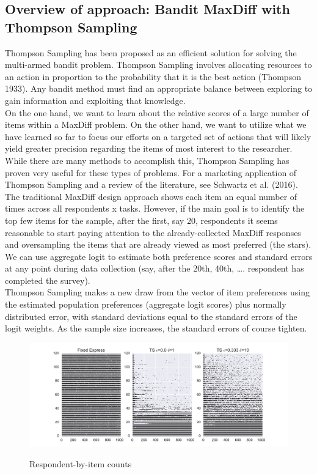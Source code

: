 \documentclass[mksc,blindrev]{informs3} %
\begin{document}
\subsection{Overview of approach: Bandit MaxDiff with Thompson Sampling}
Thompson Sampling has been proposed as an efficient solution for solving the multi-armed bandit problem.  Thompson Sampling involves allocating resources to an action in proportion to the probability that it is the best action (Thompson 1933).  Any bandit method must find an appropriate balance between exploring to gain information and exploiting that knowledge.\\
On the one hand, we want to learn about the relative scores of a large number of items within a MaxDiff problem. On the other hand, we want to utilize what we have learned so far to focus our efforts on a targeted set of actions that will likely yield greater precision regarding the items of most interest to the researcher. While there are many methods to accomplish this, Thompson Sampling has proven very useful for these types of problems. For a marketing application of Thompson Sampling and a review of the literature, see Schwartz et al. (2016). \\
The traditional MaxDiff design approach shows each item an equal number of times across all respondents x tasks.  However, if the main goal is to identify the top few items for the sample, after the first, say 20, respondents it seems reasonable to start paying attention to the already-collected MaxDiff responses and oversampling the items that are already viewed as most preferred (the stars).  We can use aggregate logit to estimate both preference scores and standard errors at any point during data collection (say, after the 20th, 40th, …. respondent has completed the survey).\\
Thompson Sampling makes a new draw from the vector of item preferences using the estimated population preferences (aggregate logit scores) plus normally distributed error, with standard deviations equal to the standard errors of the logit weights.  As the sample size increases, the standard errors of course tighten.\\
\begin{figure}[!ht]
\caption{Respondent-by-item counts}
\includegraphics[width=1\textwidth]{plots/3dotplot.pdf}
\label{fig:purpose}
\end{figure}
\end{document}
